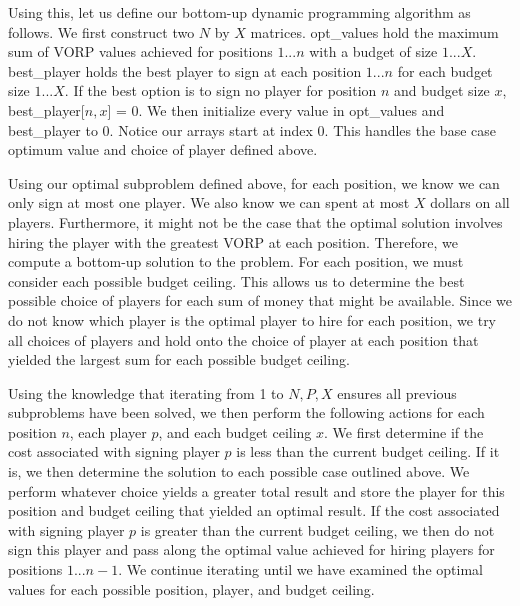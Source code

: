 \documentclass[11pt]{article}
\begin{document}
Using this, let us define our bottom-up dynamic programming algorithm as follows. We first construct two $N$ by $X$ matrices. opt\_values hold the maximum sum of VORP values achieved for positions $1...n$ with a budget of size $1...X$. best\_player holds the best player to sign at each position $1...n$ for each budget size $1...X$. If the best option is to sign no player for position $n$ and budget size $x$, best\_player[$n,x$] = 0. We then initialize every value in opt\_values and best\_player to 0. Notice our arrays start at index 0. This handles the base case optimum value and choice of player defined above.

Using our optimal subproblem defined above, for each position, we know we can only sign at most one player. We also know we can spent at most $X$ dollars on all players. Furthermore, it might not be the case that the optimal solution involves hiring the player with the greatest VORP at each position. Therefore, we compute a bottom-up solution to the problem. For each position, we must consider each possible budget ceiling. This allows us to determine the best possible choice of players for each sum of money that might be available. Since we do not know which player is the optimal player to hire for each position, we try all choices of players and hold onto the choice of player at each position that yielded the largest sum for each possible budget ceiling.

Using the knowledge that iterating from 1 to $N,P,X$ ensures all previous subproblems have been solved, we then perform the following actions for each position $n$, each player $p$, and each budget ceiling $x$. We first determine if the cost associated with signing player $p$ is less than the current budget ceiling. If it is, we then determine the solution to each possible case outlined above. We perform whatever choice yields a greater total result and store the player for this position and budget ceiling that yielded an optimal result. If the cost associated with signing player $p$ is greater than the current budget ceiling, we then do not sign this player and pass along the optimal value achieved for hiring players for positions $1...n-1$. We continue iterating until we have examined the optimal values for each possible position, player, and budget ceiling.
\end{document}
